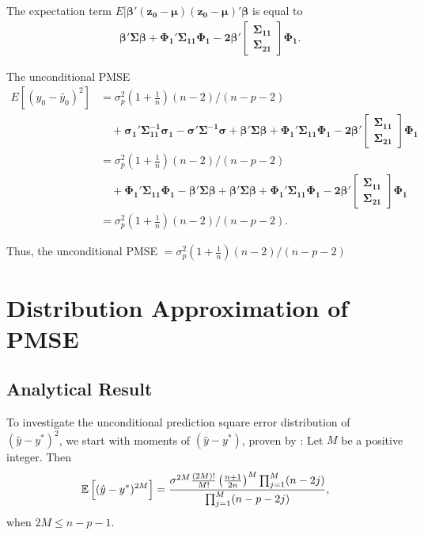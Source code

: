 The expectation term $E[\boldsymbol{\beta'(z_0-\mu)(z_0-\mu)'\beta}$ is equal to
$$\begin{aligned}
&\boldsymbol{\beta'\Sigma\beta+\Phi_1'\Sigma_{11}\Phi_1-2\beta'}
\begin{bmatrix}\boldsymbol{\Sigma_{11}}\\
\boldsymbol{\Sigma_{21}}\end{bmatrix}\boldsymbol{\Phi_1}.
\end{aligned}$$

The unconditional PMSE 
$$\begin{aligned}
E[(y_0-\tilde{y_0})^2] 
&= \sigma_p^2(1+\frac{1}{n})(n-2)/(n-p-2)\\
&\quad+\boldsymbol{\sigma_1'\Sigma_{11}^{-1}\sigma_1-\sigma'\Sigma^{-1}\sigma}+\boldsymbol{\beta'\Sigma\beta+\Phi_1'\Sigma_{11}\Phi_1-2\beta'}
\begin{bmatrix}\boldsymbol{\Sigma_{11}}\\
\boldsymbol{\Sigma_{21}}\end{bmatrix}\boldsymbol{\Phi_1}\\
&= \sigma_p^2(1+\frac{1}{n})(n-2)/(n-p-2)\\
&\quad+\boldsymbol{\Phi_1'\Sigma_{11}\Phi_1-\beta'\Sigma\beta}+\boldsymbol{\beta'\Sigma\beta+\Phi_1'\Sigma_{11}\Phi_1-2\beta'}
\begin{bmatrix}\boldsymbol{\Sigma_{11}}\\
\boldsymbol{\Sigma_{21}}\end{bmatrix}\boldsymbol{\Phi_1}\\
&= \sigma_p^2(1+\frac{1}{n})(n-2)/(n-p-2).
\end{aligned}$$

Thus, the unconditional PMSE $=\sigma_p^2(1+\frac{1}{n})(n-2)/(n-p-2)$


\section{Distribution Approximation of PMSE}
\subsection{Analytical Result}
To investigate the unconditional prediction square error distribution of $(\hat{y}-y^*)^2$, we start with moments of $(\hat{y}-y^*)$, proven by \cite{sawyer1982sample}:
Let $M$ be a positive integer. Then 
$$\mathbb{E}\left[(\hat{y}-y^*)^{2M}\right] = \frac{\sigma^{2M}\frac{(2M)!}{M!}\left(\frac{n+1}{2n}\right)^M\prod^M_{j=1}(n-2j)}{\prod^M_{j=1}(n-p-2j)},$$
when $2M\leq n-p-1$.

